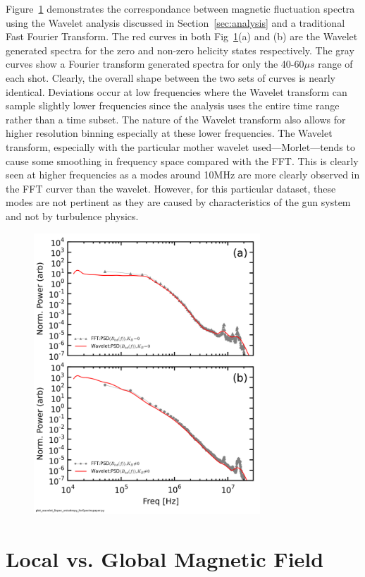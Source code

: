 \documentclass[aip,prl,amsmath,amssymb,reprint,superscriptaddress]{revtex4-1} %
\begin{document}
Figure~\ref{fig:WavevsFFT} demonstrates the correspondance between magnetic fluctuation spectra using the Wavelet analysis discussed in Section~\ref{sec:analysis} and a traditional Fast Fourier Transform. The red curves in both Fig~\ref{fig:WavevsFFT}(a) and (b) are the Wavelet generated spectra for the zero and non-zero helicity states respectively. The gray curves show a Fourier transform generated spectra for only the 40-60$\mu s$ range of each shot. Clearly, the overall shape between the two sets of curves is nearly identical. Deviations occur at low frequencies where the Wavelet transform can sample slightly lower frequencies since the analysis uses the entire time range rather than a time subset. The nature of the Wavelet transform also allows for higher resolution binning especially at these lower frequencies. The Wavelet transform, especially with the particular mother wavelet used---Morlet---tends to cause some smoothing in frequency space compared with the FFT. This is clearly seen at higher frequencies as a modes around 10MHz are more clearly observed in the FFT curver than the wavelet. However, for this particular dataset, these modes are not pertinent as they are caused by characteristics of the gun system and not by turbulence physics.

\begin{figure}[!htbp]
\centerline{
\includegraphics[width=8.5cm]{Bperppara_chan1t4_WaveletvsFFT_40t60us}}
\caption{\label{fig:WavevsFFT}}
\end{figure}

\section{Local vs. Global Magnetic Field}
\end{document}
